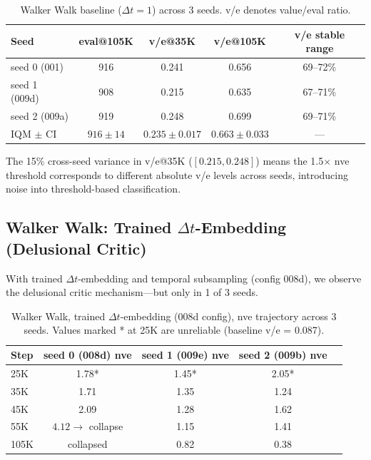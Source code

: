 \documentclass[10pt,letterpaper]{article}
\begin{document}
\begin{table}[h]
\centering
\caption{Walker Walk baseline ($\Delta t{=}1$) across 3 seeds. v/e denotes value/eval ratio.}
\label{tab:walker-baseline}
\begin{tabular}{lcccc}
\toprule
Seed & eval@105K & v/e@35K & v/e@105K & v/e stable range \\
\midrule
seed 0 (001) & 916 & 0.241 & 0.656 & 69--72\% \\
seed 1 (009d) & 908 & 0.215 & 0.635 & 67--71\% \\
seed 2 (009a) & 919 & 0.248 & 0.699 & 69--71\% \\
\midrule
IQM $\pm$ CI & $916 \pm 14$ & $0.235 \pm 0.017$ & $0.663 \pm 0.033$ & --- \\
\bottomrule
\end{tabular}
\end{table}

The 15\% cross-seed variance in v/e@35K ($[0.215, 0.248]$) means the 1.5$\times$ nve threshold corresponds to different absolute v/e levels across seeds, introducing noise into threshold-based classification.

\subsection{Walker Walk: Trained $\Delta t$-Embedding (Delusional Critic)}
\label{sec:walker-trained}

With trained $\Delta t$-embedding and temporal subsampling (config 008d), we observe the delusional critic mechanism---but only in 1 of 3 seeds.

\begin{table}[h]
\centering
\caption{Walker Walk, trained $\Delta t$-embedding (008d config), nve trajectory across 3 seeds. Values marked * at 25K are unreliable (baseline v/e = 0.087).}
\label{tab:walker-008d}
\begin{tabular}{lcccc}
\toprule
Step & seed 0 (008d) nve & seed 1 (009e) nve & seed 2 (009b) nve \\
\midrule
25K & 1.78* & 1.45* & 2.05* \\
35K & 1.71 & 1.35 & 1.24 \\
45K & 2.09 & 1.28 & 1.62 \\
55K & $4.12 \rightarrow$ collapse & 1.15 & 1.41 \\
105K & collapsed & 0.82 & 0.38 \\
\bottomrule
\end{tabular}
\end{table}
\end{document}
